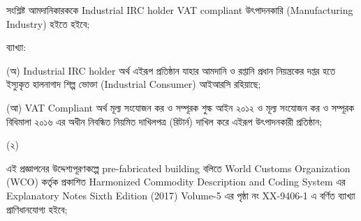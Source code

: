 \documentclass[12pt]{article}
\begin{document}
\begin{minipage}[t]{0.9\linewidth}
 সংশ্লিষ্ট আমদানিকারককে
 Industrial IRC holder VAT compliant
 উৎপাদনকারি (Manufacturing Industry) হইতে
 হইবে;
 \\
\end{minipage}
\begin{minipage}[t]{0.1\linewidth}
\hspace{1em}
\end{minipage}
\begin{minipage}[t]{0.9\linewidth}
ব্যাখ্যা:
 \\
\end{minipage}
\begin{minipage}[t]{0.1\linewidth}
\hspace{1em}
\end{minipage}
\begin{minipage}[t]{0.9\linewidth}
(অ) Industrial IRC holder অর্থ
এইরূপ প্রতিষ্ঠান যাহার আমদানি ও রপ্তানি
প্রধান নিয়ন্ত্রকের দপ্তর হতে ইস্যুকৃত হালনাগাদ
শিল্প ভোক্তা (Industrial Consumer) আইআরসি
রহিয়াছে;
\\
\end{minipage}
\begin{minipage}[t]{0.1\linewidth}
\hspace{1em}
\end{minipage}
\begin{minipage}[t]{0.9\linewidth}
(আ) VAT Compliant অর্থ মূল্য
সংযোজন কর ও সম্পূরক শুল্ক আইন ২০১২
ও মূল্য সংযোজন কর ও সম্পূরক বিধিমালা ২০১৬
এর অধীন নিবন্ধিত নিয়মিত দাখিলপত্র (রিটার্ন) দাখিল
করে এইরূপ উৎপাদনকারী প্রতিষ্ঠান;
\\
\end{minipage}
\begin{minipage}[t]{0.05\linewidth}
\hspace{1em}
\end{minipage}
\begin{minipage}[t]{0.05\linewidth}
(২)
\end{minipage}
\begin{minipage}[t]{0.9\linewidth}
এই প্রজ্ঞাপনের উদ্দেশ্যপূরণকল্পে
pre-fabricated building বলিতে
World Customs Organization (WCO) কর্তৃক
প্রকাশিত Harmonized Commodity Description
and Coding System এর Explanatory Notes
Sixth Edition (2017) Volume-5 এর পৃষ্ঠা নং
XX-9406-1 এ বর্ণিত ব্যাখ্যা প্রাণিধানযোগ্য হইবে;
\\
\end{minipage}
\begin{minipage}[t]{0.05\linewidth}
\hspace{1em}
\end{minipage}
\end{document}
